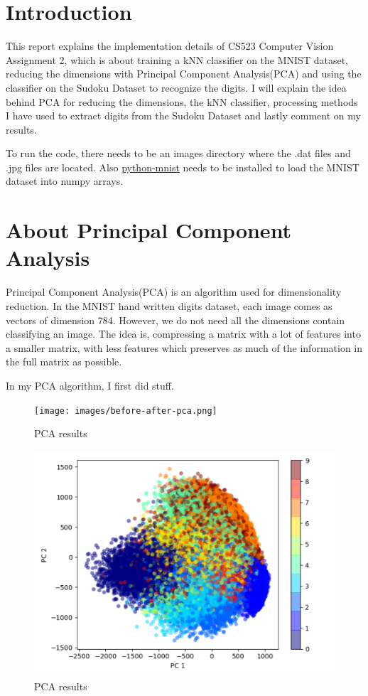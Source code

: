 \section*{Introduction}

This report explains the implementation details of CS523 Computer Vision
Assignment 2, which is about training a kNN classifier on the MNIST dataset,
reducing the dimensions with Principal Component Analysis(PCA) and using the
classifier on the Sudoku Dataset to recognize the digits. I will explain the
idea behind PCA for reducing the dimensions, the kNN classifier, processing
methods I have used to extract digits from the Sudoku Dataset and lastly comment
on my results.

To run the code, there needs to be an images directory where the .dat files and
.jpg files are located. Also
\href{https://pypi.org/project/python-mnist/} {python-mnist} needs to be
installed to load the MNIST dataset into numpy arrays.


\section*{About Principal Component Analysis} Principal Component Analysis(PCA)
is an algorithm used for dimensionality reduction. In the MNIST hand written
digits dataset, each image comes as vectors of dimension 784. However, we do
not need all the dimensions contain classifying an image.  The idea is,
compressing a matrix with a lot of features into a smaller matrix, with less
features which preserves as much of the information in the full matrix as
possible.

In my PCA algorithm, I first did stuff.
\begin{figure}[H]
    \centering
    \texttt{[image: images/before-after-pca.png]}
    \caption*{PCA results}
    \setlength{\belowcaptionskip}{-20pt}
    \setlength{\abovecaptionskip}{-20pt}
\end{figure}


\begin{figure}[H]
    \centering
    \includegraphics[width=\textwidth]{images/pca.png}
    \caption*{PCA results}
    \setlength{\belowcaptionskip}{-20pt}
    \setlength{\abovecaptionskip}{-20pt}
\end{figure}


